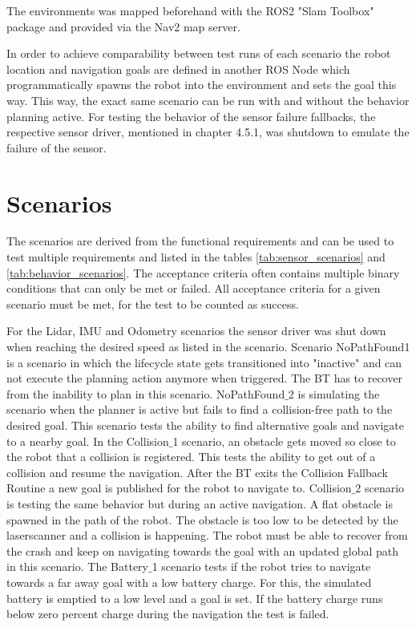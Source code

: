 The environments was mapped beforehand with the ROS2 "Slam Toolbox" package and provided via the Nav2 map server. 

In order to achieve comparability between test runs of each scenario the robot location and navigation goals are defined in another ROS Node which programmatically spawns the robot into the environment and sets the goal this way. This way, the exact same scenario can be run with and without the behavior planning active. For testing the behavior of the sensor failure fallbacks, the respective sensor driver, mentioned in chapter 4.5.1, was shutdown to emulate the failure of the sensor. 

\section{Scenarios}

The scenarios are derived from the functional requirements and can be used to test multiple requirements and listed in the tables \ref{tab:sensor_scenarios} and \ref{tab:behavior_scenarios}.
The acceptance criteria often contains multiple binary conditions that can only be met or failed. All acceptance criteria for a given scenario must be met, for the test to be counted as success.  

For the Lidar, IMU and Odometry scenarios the sensor driver was shut down when reaching the desired speed as listed in the scenario. 
Scenario NoPathFound1 is a scenario in which the lifecycle state gets transitioned into "inactive" and can not execute the planning action anymore when triggered. The BT has to recover from the inability to plan in this scenario.
NoPathFound$\_$2 is simulating the scenario when the planner is active but fails to find a collision-free path to the desired goal. This scenario tests the ability to find alternative goals and navigate to a nearby goal. 
In the Collision$\_$1 scenario, an obstacle gets moved so close to the robot that a collision is registered. This tests the ability to get out of a collision and resume the navigation. After the BT exits the Collision Fallback Routine a new goal is published for the robot to navigate to.
Collision$\_$2 scenario is testing the same behavior but during an active navigation. A flat obstacle is spawned in the path of the robot. The obstacle is too low to be detected by the laserscanner and a collision is happening. The robot must be able to recover from the crash and keep on navigating towards the goal with an updated global path in this scenario. 
The Battery$\_$1 scenario tests if the robot tries to navigate towards a far away goal with a low battery charge. For this, the simulated battery is emptied to a low level and a goal is set. If the battery charge runs below zero percent charge during the navigation the test is failed. 



